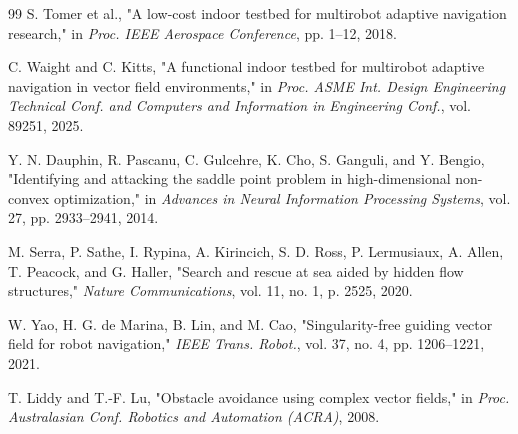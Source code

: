 \documentclass[lettersize,journal]{IEEEtran}
\begin{document}
\begin{thebibliography}{99}
 S. Tomer et al., "A low-cost indoor testbed for multirobot
adaptive navigation research," in \textit{Proc. IEEE Aerospace Conference},
pp. 1--12, 2018.

 C. Waight and C. Kitts, "A functional indoor testbed for
multirobot adaptive navigation in vector field environments," in
\textit{Proc. ASME Int. Design Engineering Technical Conf. and Computers
and Information in Engineering Conf.}, vol. 89251, 2025.

 Y. N. Dauphin, R. Pascanu, C. Gulcehre, K. Cho, S. Ganguli,
and Y. Bengio, "Identifying and attacking the saddle point problem in
high-dimensional non-convex optimization," in \textit{Advances in Neural
Information Processing Systems}, vol. 27, pp. 2933--2941, 2014.

 M. Serra, P. Sathe, I. Rypina, A. Kirincich, S. D. Ross,
P. Lermusiaux, A. Allen, T. Peacock, and G. Haller, "Search and rescue
at sea aided by hidden flow structures," \textit{Nature Communications},
vol. 11, no. 1, p. 2525, 2020.

 W. Yao, H. G. de Marina, B. Lin, and M. Cao,
"Singularity-free guiding vector field for robot navigation,"
\textit{IEEE Trans. Robot.}, vol. 37, no. 4, pp. 1206--1221, 2021.

 T. Liddy and T.-F. Lu, "Obstacle avoidance using complex
vector fields," in \textit{Proc. Australasian Conf. Robotics and
Automation (ACRA)}, 2008.

\end{thebibliography}
\end{document}
